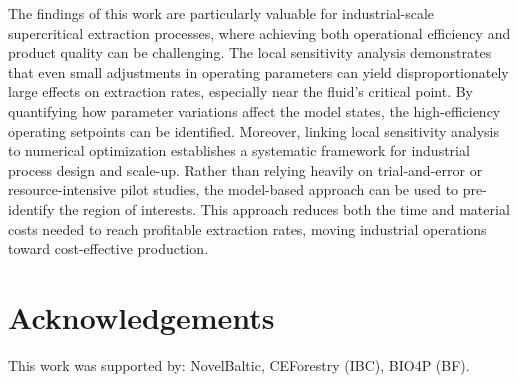 \documentclass[a4paper,fleqn]{cas-dc}
\begin{document}
	{\color{blue}The findings of this work are particularly valuable for industrial-scale supercritical extraction processes, where achieving both operational efficiency and product quality can be challenging. The local sensitivity analysis demonstrates that even small adjustments in operating parameters can yield disproportionately large effects on extraction rates, especially near the fluid’s critical point. By quantifying how parameter variations affect the model states, the high-efficiency operating setpoints can be identified. Moreover, linking local sensitivity analysis to numerical optimization establishes a systematic framework for industrial process design and scale-up. Rather than relying heavily on trial-and-error or resource-intensive pilot studies, the model-based approach can be used to pre-identify the region of interests. This approach reduces both the time and material costs needed to reach profitable extraction rates, moving industrial operations toward cost-effective production.}
	
	\section*{Acknowledgements} 
	This work was supported by: NovelBaltic, CEForestry (IBC), BIO4P (BF).
	
	\newpage
	
	
	
	\clearpage
	
\end{document}
